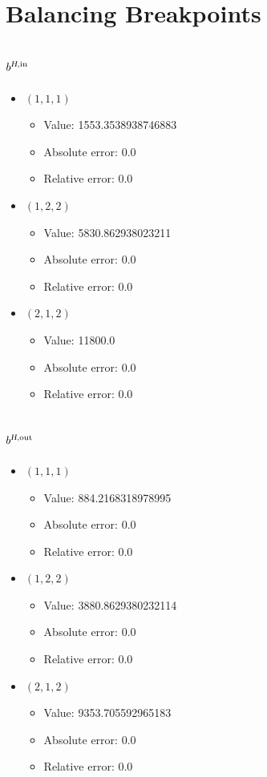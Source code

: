 \documentclass{article}%
\begin{document}
\section{Balancing Breakpoints}%
\subsection{$b^{\textsl{H},\text{in}}$}%
\begin{itemize}%
	\item $(1, 1, 1)$%
	\begin{itemize}%
		\item Value: 1553.3538938746883%
		\item Absolute error: 0.0%
		\item Relative error: 0.0%
	\end{itemize}%
	\item $(1, 2, 2)$%
	\begin{itemize}%
		\item Value: 5830.862938023211%
		\item Absolute error: 0.0%
		\item Relative error: 0.0%
	\end{itemize}%
	\item $(2, 1, 2)$%
	\begin{itemize}%
		\item Value: 11800.0%
		\item Absolute error: 0.0%
		\item Relative error: 0.0%
	\end{itemize}%
\end{itemize}%
\subsection{$b^{\textsl{H},\text{out}}$}%
\begin{itemize}%
	\item $(1, 1, 1)$%
	\begin{itemize}%
		\item Value: 884.2168318978995%
		\item Absolute error: 0.0%
		\item Relative error: 0.0%
	\end{itemize}%
	\item $(1, 2, 2)$%
	\begin{itemize}%
		\item Value: 3880.8629380232114%
		\item Absolute error: 0.0%
		\item Relative error: 0.0%
	\end{itemize}%
	\item $(2, 1, 2)$%
	\begin{itemize}%
		\item Value: 9353.705592965183%
		\item Absolute error: 0.0%
		\item Relative error: 0.0%
	\end{itemize}%
\end{itemize}%
\end{document}
